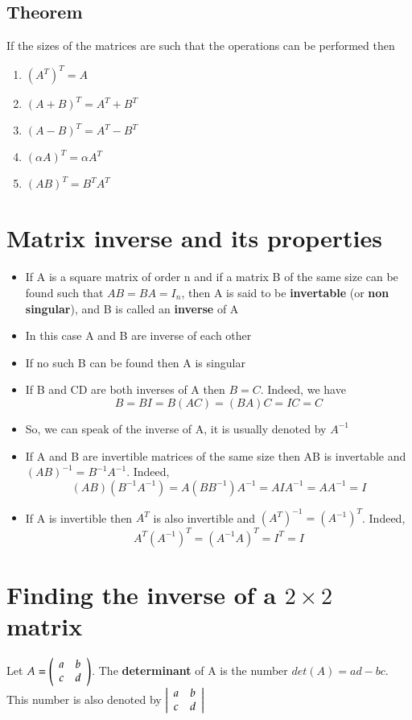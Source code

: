 \documentclass{article}[18pt]
\begin{document}
\subsection{Theorem}
If the sizes of the matrices are such that the operations can be performed then
\begin{enumerate}
	\item $(A^T)^T=A$
	\item $(A+B)^T=A^T+B^T$
	\item $(A-B)^T=A^T-B^T$
	\item $(\alpha A)^T=\alpha A^T$
	\item $(AB)^T=B^TA^T$
\end{enumerate}
\section{Matrix inverse and its properties}
\begin{itemize}
	\item If A is a square matrix of order n and if a matrix B of the same size can be found such that $AB=BA=I_n$, then A is said to be \textbf{invertable} (or \textbf{non singular}), and B is called an \textbf{inverse} of A
	\item In this case A and B are inverse of each other
	\item If no such B can be found then A is singular
	\item If B and CD are both inverses of A then $B=C$. Indeed, we have
	$$B = B I = B ( A C ) = ( B A ) C = I C = C$$
	\item So, we can speak of the inverse of A, it is usually denoted by $A^{-1}$
	\item If A and B are invertible matrices of the same size then AB is invertable and $(AB)^{-1}=B^{-1}A^{-1}$. Indeed,
	$$( A B ) \left( B ^ { - 1 } A ^ { - 1 } \right) = A \left( B B ^ { - 1 } \right) A ^ { - 1 } = A I A ^ { - 1 } = A A ^ { - 1 } = I$$
	\item If A is invertible then $A^T$ is also invertible and $(A^T)^{-1}=(A^{-1})^T$. Indeed,
	$$A ^ { T } \left( A ^ { - 1 } \right) ^ { T } = \left( A ^ { - 1 } A \right) ^ { T } = I ^ { T } = I$$
\end{itemize}
\section{Finding the inverse of a $2\times 2$ matrix}
Let $A = \left( \begin{array} { l l } { a } & { b } \\ { c } & { d } \end{array} \right)$. The \textbf{determinant} of A is the number $det(A)=ad-bc$. This number is also denoted by $\left| \begin{array} { l l } { a } & { b } \\ { c } & { d } \end{array} \right|$
\end{document}
